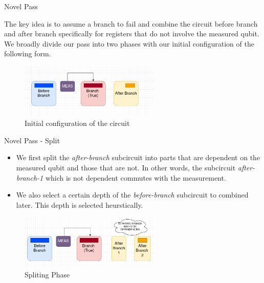 \documentclass[10pt]{beamer}
\begin{document}
\begin{frame}{Novel Pass}
  
  The key idea is to assume a branch to fail and combine the circuit before branch and after branch specifically for registers that do not involve the measured qubit. We broadly divide our pass into two phases with our initial configuration of the following form.

  \begin{figure}
    \includegraphics[width=0.6\textwidth]{Images/start.png}
    \caption{Initial configuration of the circuit}
    \label{fig:start}
  \end{figure}

\end{frame}


\begin{frame}{Novel Pass - Split}

  \begin{itemize}
    \item We first split the \emph{after-branch} subcircuit into parts that are dependent on the measured qubit and those that are not. In other words, the subcircuit \emph{after-branch-1} which is not dependent commutes with the measurement.

      \pause

    \item We also select a certain depth of the \emph{before-branch} subcircuit to combined later. This depth is selected heurstically.
  \end{itemize}

  \pause

  \begin{figure}
    \includegraphics[width=0.6\textwidth]{Images/sep.png}
    \caption{Spliting Phase}
    \label{fig:split}
  \end{figure}

\end{frame}
\end{document}
